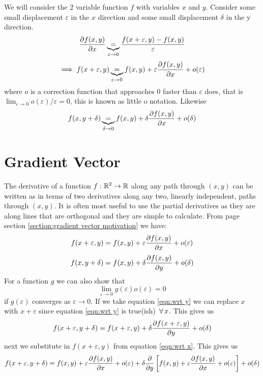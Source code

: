 \documentclass{article}
\begin{document}
    We will consider the 2 variable function \(f\) with variables \(x\) and \(y\). Consider some small displacement \(\varepsilon\) in the \(x\) direction and some small displacement \(\delta\) in the y direction.
    \[\pdv{f(x, y)}{x}\underbrace{=}_{\varepsilon\to 0}\frac{f(x+\varepsilon, y) - f(x, y)}{\varepsilon}\]
    \[\implies f(x+\varepsilon, y) \underbrace{=}_{\varepsilon\to 0} f(x, y) + \varepsilon\pdv{f(x, y)}{x} + o(\varepsilon)\]
    where \(o\) is a correction function that approaches 0 faster than \(\varepsilon\) does, that is \(\lim_{\varepsilon\to 0}o(\varepsilon)/\varepsilon = 0\), this is known as little o notation.
    Likewise
    \[f(x, y + \delta) \underbrace{=}_{\delta\to 0} f(x, y) + \delta\pdv{f(x, y)}{x} + o(\delta)\]
    
    \section{Gradient Vector}\label{sec:grad}
    The derivative of a function \(f:\mathbb{R}^2\to \mathbb{R}\) along any path through \((x, y)\) can be written as in terms of two derivatives along any two, linearly independent, paths through \((x, y)\). 
    It is often most useful to use the partial derivatives as they are along lines that are orthogonal and they are simple to calculate.
    From page \pageref{section:gradient vector motivation} section \ref{section:gradient vector motivation} we have:
    \begin{equation}\label{eqn:wrt x}
        f(x + \varepsilon, y) = f(x, y) + \varepsilon\pdv{f(x, y)}{x} + o(\varepsilon)
    \end{equation}
    \begin{equation}\label{eqn:wrt y}
        f(x, y + \delta) = f(x, y) + \delta\pdv{f(x, y)}{y} + o(\delta)
    \end{equation}
    For a function \(g\) we can also show that
    \[\lim_{\varepsilon\to 0}g(\varepsilon)o(\varepsilon) = 0\]
    if \(g(\varepsilon)\) converges as \(\varepsilon\to 0\).
    If we take equation \ref{eqn:wrt y} we can replace \(x\) with \(x + \varepsilon\) since equation \ref{eqn:wrt y} is true(ish) \(\,\forall\, x\).
    This gives us
    \[f(x + \varepsilon, y + \delta) = f(x + \varepsilon, y) + \delta\pdv{f(x + \varepsilon, y)}{y} + o(\delta)\]
    next we substitute in \(f(x + \varepsilon, y)\) from equation \ref{eqn:wrt x}.
    This gives us
    \[f(x + \varepsilon, y + \delta) = f(x, y) + \varepsilon\pdv{f(x, y)}{x} + o(\varepsilon) + \delta\pdv{y}\left[f(x, y) + \varepsilon\pdv{f(x, y)}{x} + o(\varepsilon)\right] + o(\delta)\]
\end{document}
